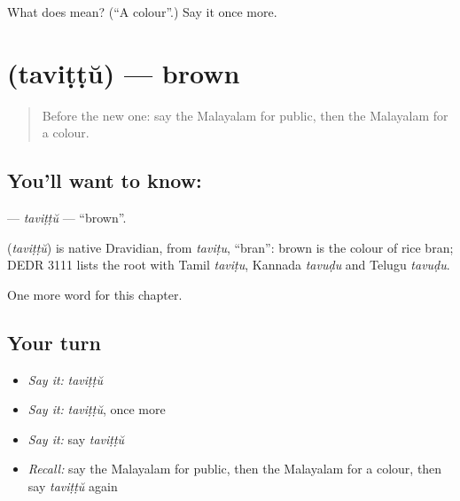 \begin{tcolorbox}[breakable,colback=teal!4,colframe=teal!35!black,title={Before you move on}]
What does  mean? (\textquotedblleft{}A colour\textquotedblright{}.) Say it once more.
\end{tcolorbox}
\section[\texorpdfstring{\ml{തവിട്ട്} (taviṭṭŭ)}{തവിട്ട് (taviṭṭŭ)}]{ (taviṭṭŭ) — brown}

\label{lesson:ML-C245-tavittu}



\begin{quote}
Before the new one: say the Malayalam for public, then the Malayalam for a colour.
\end{quote}

\subsection*{You'll want to know: }
\textbf{} — \emph{taviṭṭŭ} — \textquotedblleft{}brown\textquotedblright{}.

\begin{cousinweb}
\textbf{} (\emph{taviṭṭŭ}) is native Dravidian, from \emph{taviṭu}, \textquotedblleft{}bran\textquotedblright{}: brown is the colour of rice bran; DEDR 3111 lists the root with Tamil \emph{taviṭu}, Kannada \emph{tavuḍu} and Telugu \emph{tavuḍu}.
\end{cousinweb}

\begin{grammarlens}[title={What you've built}]
One more word for this chapter.
\end{grammarlens}

\subsection*{Your turn}
\begin{itemize}
\raggedright
  \item \emph{Say it:} \emph{taviṭṭŭ}
  \item \emph{Say it:} \emph{taviṭṭŭ}, once more
  \item \emph{Say it:} say \emph{taviṭṭŭ}
  \item \emph{Recall:} say the Malayalam for public, then the Malayalam for a colour, then say \emph{taviṭṭŭ} again
\end{itemize}

